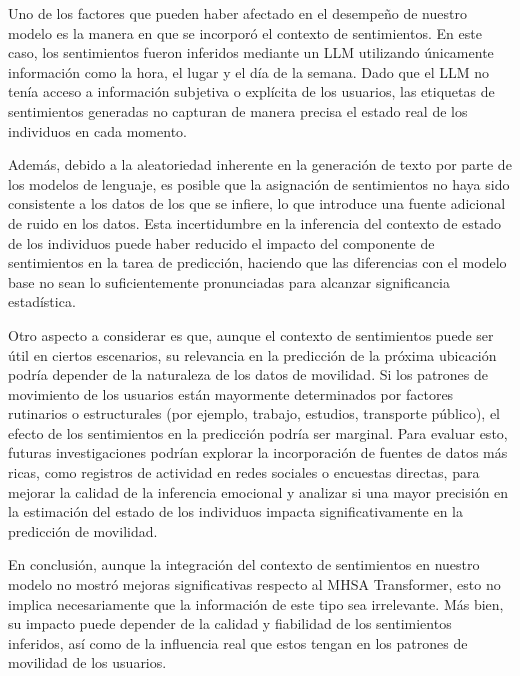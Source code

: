 Uno de los factores que pueden haber afectado
 en el desempeño de nuestro modelo 
es la manera en que se 
incorporó el contexto de sentimientos. En este caso, 
los sentimientos fueron inferidos mediante un LLM 
utilizando únicamente información como la hora, el lugar y 
el día de la semana. Dado que el LLM no tenía acceso a 
información subjetiva o explícita de los usuarios, 
las etiquetas de sentimientos generadas no  
capturan de manera precisa el estado real de 
los individuos en cada momento.

Además, debido a la aleatoriedad inherente en la 
generación de texto por parte de los modelos de 
lenguaje, es posible que la asignación de sentimientos no 
haya sido consistente a los datos de los que se infiere, 
lo que introduce una fuente 
adicional de ruido en los datos. Esta incertidumbre 
en la inferencia del contexto de estado de los individuos 
puede haber reducido 
el impacto del componente de sentimientos en la tarea de 
predicción, haciendo que las diferencias con el modelo base 
no sean lo suficientemente pronunciadas para alcanzar 
significancia estadística.

Otro aspecto a considerar es que, aunque el contexto de 
sentimientos puede ser útil en ciertos escenarios, su 
relevancia en la predicción de la próxima ubicación podría 
depender de la naturaleza de los datos de movilidad. 
Si los patrones de movimiento de los usuarios están 
mayormente determinados por factores rutinarios o 
estructurales (por ejemplo, trabajo, estudios, 
transporte público), el efecto de los sentimientos en la 
predicción podría ser marginal. Para evaluar esto, futuras 
investigaciones podrían explorar la incorporación de fuentes 
de datos más ricas, como registros de actividad en redes 
sociales o encuestas directas, para mejorar la calidad de 
la inferencia emocional y analizar si una mayor precisión 
en la estimación del estado de los individuos impacta 
significativamente en la predicción de movilidad.

En conclusión, aunque la integración del contexto de 
sentimientos en nuestro modelo no mostró mejoras 
significativas respecto al MHSA Transformer, esto no 
implica necesariamente que la información de este tipo sea 
irrelevante. Más bien, su impacto puede depender de la 
calidad y fiabilidad de los sentimientos inferidos, 
así como de la influencia real que estos tengan en 
los patrones de movilidad de los usuarios.

